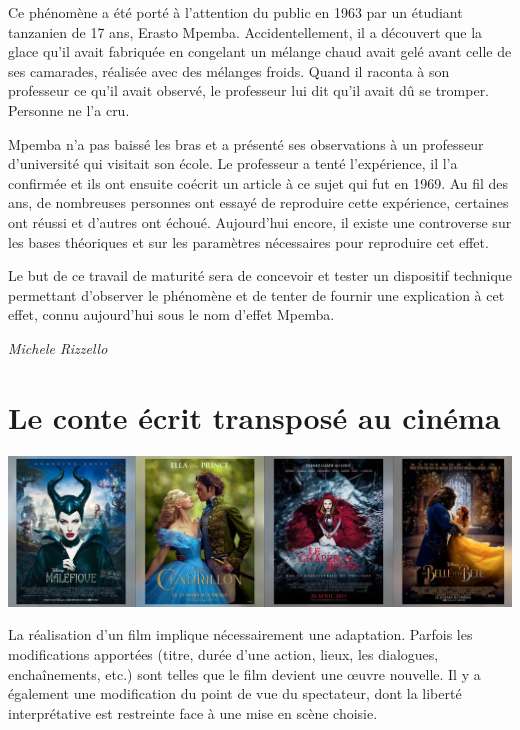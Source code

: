 \documentclass[
  10pt,
  french,
  a5paper,
  openany]{book}
\newenvironment{signature}{\begin{flushright}}{\end{flushright}}
\begin{document}
Ce phénomène a été porté à l'attention du public en 1963 par un étudiant tanzanien de 17 ans, Erasto Mpemba. Accidentellement, il a découvert que la glace qu'il avait fabriquée en congelant un mélange chaud avait gelé avant celle de ses camarades, réalisée avec des mélanges froids. Quand il raconta à son professeur ce qu'il avait observé, le professeur lui dit qu'il avait dû se tromper. Personne ne l'a cru.

Mpemba n'a pas baissé les bras et a présenté ses observations à un professeur d'université qui visitait son école. Le professeur a tenté l'expérience, il l'a confirmée et ils ont ensuite coécrit un article à ce sujet qui fut en 1969. Au fil des ans, de nombreuses personnes ont essayé de reproduire cette expérience, certaines ont réussi et d'autres ont échoué. Aujourd'hui encore, il existe une controverse sur les bases théoriques et sur les paramètres nécessaires pour reproduire cet effet.

Le but de ce travail de maturité sera de concevoir et tester un dispositif technique permettant d'observer le phénomène et de tenter de fournir une explication à cet effet, connu aujourd'hui sous le nom d'effet Mpemba.

\begin{signature}
\emph{Michele Rizzello}

\end{signature}

\hypertarget{le-conte-uxe9crit-transposuxe9-au-cinuxe9ma}{%
\chapter{Le conte écrit transposé au cinéma}\label{le-conte-uxe9crit-transposuxe9-au-cinuxe9ma}}

\begin{center}
\includegraphics[width=1\textwidth,height=\textheight]{images/le-conte-ecrit-transpose-au-cinema.jpg}

\end{center}

La réalisation d'un film implique nécessairement une adaptation. Parfois les modifications apportées (titre, durée d'une action, lieux, les dialogues, enchaînements, etc.) sont telles que le film devient une œuvre nouvelle.
Il y a également une modification du point de vue du spectateur, dont la liberté interprétative est restreinte face à une mise en scène choisie.
\end{document}
